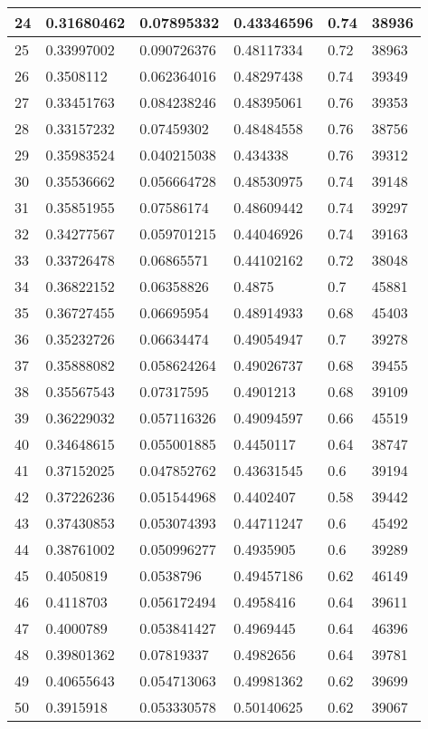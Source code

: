 \begin{longtable}{|l|l|l|l|l|l|}
24 & 0.31680462 & 0.07895332 & 0.43346596 & 0.74 & 38936 \\ \hline 
25 & 0.33997002 & 0.090726376 & 0.48117334 & 0.72 & 38963 \\ \hline 
26 & 0.3508112 & 0.062364016 & 0.48297438 & 0.74 & 39349 \\ \hline 
27 & 0.33451763 & 0.084238246 & 0.48395061 & 0.76 & 39353 \\ \hline 
28 & 0.33157232 & 0.07459302 & 0.48484558 & 0.76 & 38756 \\ \hline 
29 & 0.35983524 & 0.040215038 & 0.434338 & 0.76 & 39312 \\ \hline 
30 & 0.35536662 & 0.056664728 & 0.48530975 & 0.74 & 39148 \\ \hline 
31 & 0.35851955 & 0.07586174 & 0.48609442 & 0.74 & 39297 \\ \hline 
32 & 0.34277567 & 0.059701215 & 0.44046926 & 0.74 & 39163 \\ \hline 
33 & 0.33726478 & 0.06865571 & 0.44102162 & 0.72 & 38048 \\ \hline 
34 & 0.36822152 & 0.06358826 & 0.4875 & 0.7 & 45881 \\ \hline 
35 & 0.36727455 & 0.06695954 & 0.48914933 & 0.68 & 45403 \\ \hline 
36 & 0.35232726 & 0.06634474 & 0.49054947 & 0.7 & 39278 \\ \hline 
37 & 0.35888082 & 0.058624264 & 0.49026737 & 0.68 & 39455 \\ \hline 
38 & 0.35567543 & 0.07317595 & 0.4901213 & 0.68 & 39109 \\ \hline 
39 & 0.36229032 & 0.057116326 & 0.49094597 & 0.66 & 45519 \\ \hline 
40 & 0.34648615 & 0.055001885 & 0.4450117 & 0.64 & 38747 \\ \hline 
41 & 0.37152025 & 0.047852762 & 0.43631545 & 0.6 & 39194 \\ \hline 
42 & 0.37226236 & 0.051544968 & 0.4402407 & 0.58 & 39442 \\ \hline 
43 & 0.37430853 & 0.053074393 & 0.44711247 & 0.6 & 45492 \\ \hline 
44 & 0.38761002 & 0.050996277 & 0.4935905 & 0.6 & 39289 \\ \hline 
45 & 0.4050819 & 0.0538796 & 0.49457186 & 0.62 & 46149 \\ \hline 
46 & 0.4118703 & 0.056172494 & 0.4958416 & 0.64 & 39611 \\ \hline 
47 & 0.4000789 & 0.053841427 & 0.4969445 & 0.64 & 46396 \\ \hline 
48 & 0.39801362 & 0.07819337 & 0.4982656 & 0.64 & 39781 \\ \hline 
49 & 0.40655643 & 0.054713063 & 0.49981362 & 0.62 & 39699 \\ \hline 
50 & 0.3915918 & 0.053330578 & 0.50140625 & 0.62 & 39067 \\ \hline 
\end{longtable}